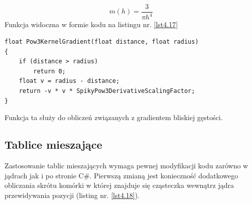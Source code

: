 \documentclass{article}
\begin{document}
\begin{center}
\newline
\caption{Rysunek 12: Gradient funkcji trzeciego stopnia}
\label{functions_5}
\end{center}


\begin{equation}\label{eqn34}
m(h) = \frac{3}{\pi h^4}
\end{equation}
\newline
\noindent
Funkcja widoczna w formie kodu na listingu nr. \ref{lst4.17}\newline
\begin{lstlisting}[caption=Gradient funkcji trzeciego stopnia, label={lst4.17}]
float Pow3KernelGradient(float distance, float radius)
{
	if (distance > radius)
        return 0;
	float v = radius - distance;
	return -v * v * SpikyPow3DerivativeScalingFactor;
}
\end{lstlisting}
\noindent
Funkcja ta służy do obliczeń związanych z gradientem bliskiej gęstości.\newline
\newpage
\subsection{Tablice mieszające}
Zastosowanie tablic mieszających wymaga pewnej modyfikacji kodu zarówno w jądrach jak i po stronie C\#.\newline
Pierwszą zmianą jest konieczność dodatkowego obliczania skrótu komórki w której znajduje się cząsteczka wewnątrz jądra przewidywania pozycji (listing nr. \ref{lst4.18}).\newline
\end{document}
